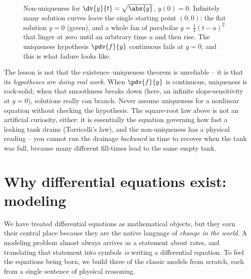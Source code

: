\begin{figure}[H]
\centering
{}
\caption{Non-uniqueness for $\dv{y}{t}=\sqrt{\abs{y}}$, $y(0)=0$. Infinitely many solution curves leave the single starting point $(0,0)$: the flat solution $y=0$ (green), and a whole fan of parabolas $y=\tfrac14(t-a)^2$ that linger at zero until an arbitrary time $a$ and then rise. The uniqueness hypothesis $\pdv{f}{y}$ continuous fails at $y=0$, and this is what failure looks like.}
\label{ch36:fig-branch}
\end{figure}

\begin{trapbox}
The lesson is not that the existence--uniqueness theorem is unreliable -- it is that its \emph{hypotheses are doing real work}. When $\pdv{f}{y}$ is continuous, uniqueness is rock-solid; when that smoothness breaks down (here, an infinite slope-sensitivity at $y=0$), solutions really can branch. Never assume uniqueness for a nonlinear equation without checking the hypothesis. The square-root law above is not an artificial curiosity, either: it is essentially the equation governing how fast a leaking tank drains (Torricelli's law), and the non-uniqueness has a physical reading -- you cannot run the drainage \emph{backward} in time to recover when the tank was full, because many different fill-times lead to the same empty tank.
\end{trapbox}

\section{Why differential equations exist: modeling}
\label{ch36:sec-model}

We have treated differential equations as mathematical objects, but they earn their central place because they are the native language of \emph{change in the world}. A modeling problem almost always arrives as a statement about rates, and translating that statement into symbols \emph{is} writing a differential equation. To feel the equations being born, we build three of the classic models from scratch, each from a single sentence of physical reasoning.

